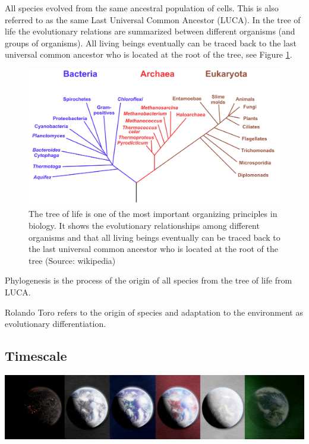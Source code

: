 \documentclass[
  11pt,
]{book}
\begin{document}
All species evolved from the same ancestral population of cells.
This is also referred to as the same Last Universal Common Ancestor (LUCA).
In the tree of life the evolutionary relations are summarized between different organisms (and groups of organisms). All living beings eventually can be traced back to the last universal common ancestor who is located at the root of the tree, see Figure \ref{fig:treeOfLifeBis}.

\begin{figure}

{\centering \includegraphics[width=1\linewidth]{./figs/Phylogenetic_tree} 

}

\caption{The tree of life is one of the most important organizing principles in biology. It shows the evolutionary relationships among different organisms and that all living beings eventually can be traced back to the last universal common ancestor who is located at the root of the tree (Source: wikipedia)}\label{fig:treeOfLifeBis}
\end{figure}

Phylogenesis is the process of the origin of all species from the tree of life from LUCA.

Rolando Toro refers to the origin of species and adaptation to the environment as evolutionary differentiation.

\hypertarget{timescale}{%
\subsection{Timescale}\label{timescale}}

\includegraphics{./figs/liferockystartstrip.jpeg}
\end{document}
